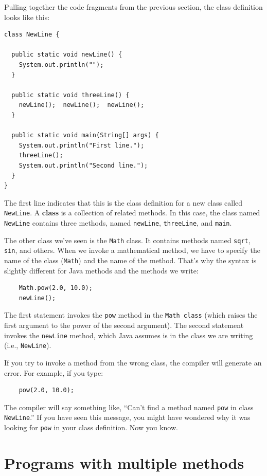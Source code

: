 \documentclass[12pt]{book}
\theoremstyle{exercise}
\begin{document}
Pulling together the code fragments from the previous
section, the class definition looks like this:

\begin{lstlisting}
class NewLine {

  public static void newLine() {
    System.out.println("");
  }

  public static void threeLine() {
    newLine();  newLine();  newLine();
  }

  public static void main(String[] args) {
    System.out.println("First line.");
    threeLine();
    System.out.println("Second line.");
  }
}
\end{lstlisting}
%
The first line indicates that this is the class definition for a new
class called {\tt NewLine}.  A {\bf class} is a collection of related
methods.  In this case, the class named {\tt NewLine} contains three
methods, named {\tt newLine}, {\tt threeLine}, and {\tt main}.

The other class we've seen is the {\tt Math} class.  It contains
methods named {\tt sqrt}, {\tt sin}, and others.  When
we invoke a mathematical method, we have to specify
the name of the class ({\tt Math}) and the name of the method.
That's why the syntax is slightly different for Java
methods and the methods we write:

\begin{lstlisting}
    Math.pow(2.0, 10.0);
    newLine();
\end{lstlisting}
%
The first statement invokes the {\tt pow} method in
the {\tt Math class} (which raises the first argument to the
power of the second argument).  The second statement invokes
the {\tt newLine} method, which Java assumes is in the class
we are writing (i.e., {\tt NewLine}).

If you try to invoke a method from the wrong class, the
compiler will generate an error.  For example, if you
type:

\begin{lstlisting}
    pow(2.0, 10.0);
\end{lstlisting}
%
The compiler will say something like, ``Can't find a method
named {\tt pow} in class {\tt NewLine}.''  If you have
seen this message, you might have wondered why it was looking
for {\tt pow} in your class definition.  Now you know.


\section {Programs with multiple methods}
\end{document}
